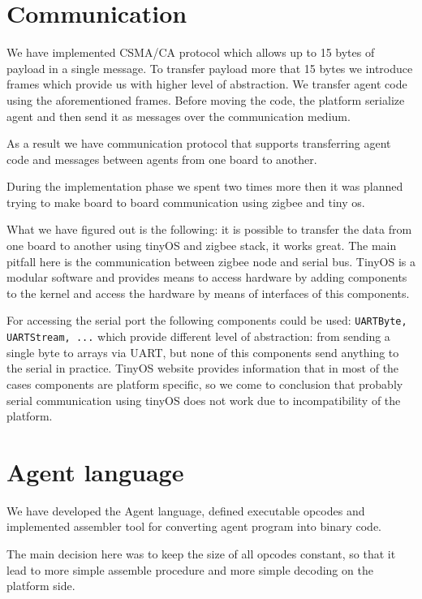 \documentclass{scrreprt}
\begin{document}
\section{Communication}

We have implemented CSMA/CA protocol which allows up to 15 bytes of payload
in a single message.
To transfer payload more that 15 bytes we introduce frames which
provide us with higher level of abstraction.
We transfer agent code using the aforementioned frames.
Before moving the code, the platform serialize agent and then send it as
messages over the communication medium.

As a result we have communication protocol that supports transferring 
agent code and messages between agents from one board to another.

During the implementation phase we spent two times more then it was planned 
trying to make board to board communication using zigbee and tiny os.


What we have figured out is the following: it is possible to transfer the data
from one board to another using tinyOS and zigbee stack, it works great. 
The main pitfall here is the communication between zigbee node and serial bus.
TinyOS is a modular software and provides means to access hardware by adding 
components to the kernel and access the hardware by means of interfaces of this components.


For accessing the serial port the following components could be used: \texttt{UARTByte, UARTStream, ...}
which provide different level of abstraction: from sending a single byte to arrays
via UART, but none of this components send anything to the serial in practice.
TinyOS website provides information that in most of the cases components are 
platform specific, so we come to conclusion that probably serial communication
using tinyOS does not work due to incompatibility of the platform.

\section{Agent language}

We have developed the Agent language, defined executable opcodes and implemented
 assembler tool for  converting agent program 
into binary code.

The main decision here was to keep the size of all opcodes constant,
so that it lead to more simple assemble procedure and more simple decoding
on the platform side.
\end{document}
